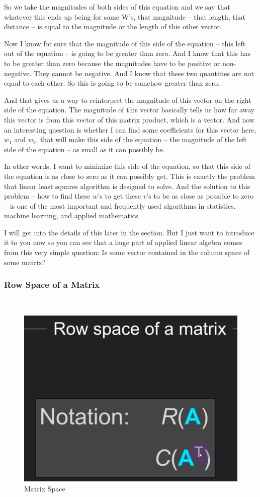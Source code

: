 \documentclass[fleqn,10pt]{olplainarticle}
\theoremstyle{definition}
\theoremstyle{remark}
\begin{document}
So we take the magnitudes of both sides of this equation and we say that whatever this ends up being for some W's, that magnitude -- that length, that distance -- is equal to the magnitude or the length of this other vector.

Now I know for sure that the magnitude of this side of the equation -- this left out of the equation -- is going to be greater than zero. And I know that this has to be greater than zero because the magnitudes have to be positive or non-negative. They cannot be negative. And I know that these two quantities are not equal to each other. So this is going to be somehow greater than zero.

And that gives us a way to reinterpret the magnitude of this vector on the right side of the equation. The magnitude of this vector basically tells us how far away this vector is from this vector of this matrix product, which is a vector. And now an interesting question is whether I can find some coefficients for this vector here, $w_1$ and $w_2$, that will make this side of the equation -- the magnitude of the left side of the equation -- as small as it can possibly be.

In other words, I want to minimize this side of the equation, so that this side of the equation is as close to zero as it can possibly get. This is exactly the problem that linear least squares algorithm is designed to solve. And the solution to this problem -- how to find these $w$'s to get these $v$'s to be as close as possible to zero -- is one of the most important and frequently used algorithms in statistics, machine learning, and applied mathematics.

I will get into the details of this later in the section. But I just want to introduce it to you now so you can see that a huge part of applied linear algebra comes from this very simple question: Is some vector contained in the column space of some matrix?

\pagebreak

\subsubsection*{Row Space of a Matrix}\

\begin{figure}[ht]
	\centering
	\includegraphics[width=0.2\linewidth]{images/matrix-space-13.png}
	\caption{Matrix Space}
	\label{fig:matrix_space_13}
\end{figure}
\end{document}
